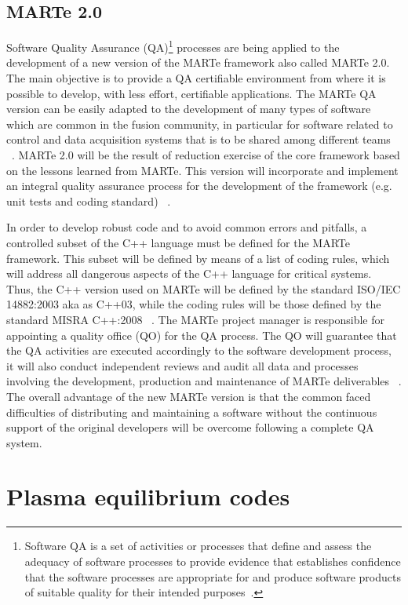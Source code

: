 \subsection{MARTe 2.0}
Software Quality Assurance (QA)\footnote{Software QA is a set of activities or processes that define and assess the adequacy of software processes to provide evidence that establishes confidence that the software processes are appropriate for and produce software products of suitable quality for their intended purposes~\cite[Chapter 5.1]{SQA}.} processes are being applied to the development of a new version of the MARTe framework also  called MARTe 2.0. The  main objective is to provide a QA certifiable environment from where it is possible to develop, with less effort, certifiable applications. The  MARTe QA version can be easily adapted to the development of many types of software which are common in the fusion community, in particular for software related to control and data acquisition systems that is to be shared among different teams  ~\cite{MARTe2}. MARTe 2.0 will be the result of reduction exercise of the core framework based on the lessons learned from MARTe. This version will incorporate and implement an integral quality assurance process for the development of the framework (e.g. unit tests and coding standard) ~\cite{MARTe2PMP}. 
\smallskip

In order to develop robust code and to avoid common errors and pitfalls, a controlled subset of the C++ language must be defined for the MARTe framework. This subset will be defined by means of a list of coding rules, which will address all dangerous aspects of the C++ language for critical systems. Thus, the C++ version used on MARTe will be defined by the standard ISO/IEC 14882:2003 aka as C++03, while the coding rules will be those defined by the standard MISRA C++:2008 ~\cite{MARTe2Code}. The MARTe project manager is responsible for appointing a quality office (QO) for the QA process. The QO will guarantee that the QA activities are executed accordingly to the software development process, it will also conduct independent reviews and audit all data and processes involving the development, production and maintenance of MARTe deliverables ~\cite{MARTe2QAP}. The overall advantage of the new MARTe version is that the common faced difficulties of distributing and maintaining a software without  the continuous support of the original developers will be overcome following a complete QA system.



\section{Plasma equilibrium codes} 

